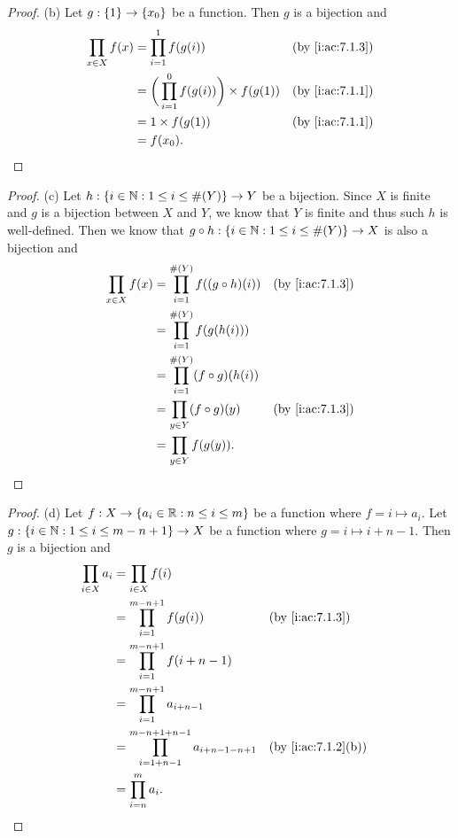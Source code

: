 \begin{proof}{(b)}
  Let \(g : \left\lbrace1\right\rbrace \to \left\lbrace x_0\right\rbrace\) be a function.
  Then \(g\) is a bijection and
  \begin{align*}
    \prod_{x \in X} f(x) & = \prod_{i = 1}^1 f(g(i))                            &  & \by{i:ac:7.1.3} \\
                         & = \bigg(\prod_{i = 1}^0 f(g(i))\bigg) \times f(g(1)) &  & \by{i:ac:7.1.1} \\
                         & = 1 \times f(g(1))                                   &  & \by{i:ac:7.1.1} \\
                         & = f(x_0).
  \end{align*}
\end{proof}

\begin{proof}{(c)}
  Let \(h : \left\lbrace i \in \mathbb{N} : 1 \leq i \leq \#(Y)\right\rbrace \to Y\) be a bijection.
  Since \(X\) is finite and \(g\) is a bijection between \(X\) and \(Y\), we know that \(Y\) is finite and thus such \(h\) is well-defined.
  Then we know that \(g \circ h : \left\lbrace i \in \mathbb{N} : 1 \leq i \leq \#(Y)\right\rbrace \to X\) is also a bijection and
  \begin{align*}
    \prod_{x \in X} f(x) & = \prod_{i = 1}^{\#(Y)} f((g \circ h)(i)) &  & \by{i:ac:7.1.3} \\
                         & = \prod_{i = 1}^{\#(Y)} f(g(h(i)))                             \\
                         & = \prod_{i = 1}^{\#(Y)} (f \circ g)(h(i))                      \\
                         & = \prod_{y \in Y} (f \circ g)(y)          &  & \by{i:ac:7.1.3} \\
                         & = \prod_{y \in Y} f(g(y)).
  \end{align*}
\end{proof}

\begin{proof}{(d)}
  Let \(f : X \to \left\lbrace a_i \in \mathbb{R} : n \leq i \leq m\right\rbrace\) be a function where \(f = i \mapsto a_i\).
  Let \(g : \left\lbrace i \in \mathbb{N} : 1 \leq i \leq m - n + 1\right\rbrace \to X\) be a function where \(g = i \mapsto i + n - 1\).
  Then \(g\) is a bijection and
  \begin{align*}
    \prod_{i \in X} a_i & = \prod_{i \in X} f(i)                                                                    \\
                        & = \prod_{i = 1}^{m - n + 1} f(g(i))                               &  & \by{i:ac:7.1.3}    \\
                        & = \prod_{i = 1}^{m - n + 1} f(i + n - 1)                                                  \\
                        & = \prod_{i = 1}^{m - n + 1} a_{i + n - 1}                                                 \\
                        & = \prod_{i = 1 + n - 1}^{m - n + 1 + n - 1} a_{i + n - 1 - n + 1} &  & \by{i:ac:7.1.2}[b] \\
                        & = \prod_{i = n}^m a_i.
  \end{align*}
\end{proof}

